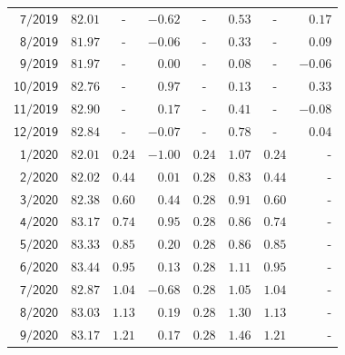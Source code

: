 \documentclass[11pt,a4paper]{article}
\begin{document}
\begin{minipage}[t]{0.54\textwidth}
\begin{tabular}{rccrcrcr}
$\mathsf{7/2019}$ & $\mathsf{82.01}$ & - & $\mathsf{-0.62}$ & - & $\mathsf{0.53}$ & - & $\mathsf{0.17}$ \\
$\mathsf{8/2019}$ & $\mathsf{81.97}$ & - & $\mathsf{-0.06}$ & - & $\mathsf{0.33}$ & - & $\mathsf{0.09}$ \\
$\mathsf{9/2019}$ & $\mathsf{81.97}$ & - & $\mathsf{0.00}$ & - & $\mathsf{0.08}$ & - & $\mathsf{-0.06}$ \\
$\mathsf{10/2019}$ & $\mathsf{82.76}$ & - & $\mathsf{0.97}$ & - & $\mathsf{0.13}$ & - & $\mathsf{0.33}$ \\
$\mathsf{11/2019}$ & $\mathsf{82.90}$ & - & $\mathsf{0.17}$ & - & $\mathsf{0.41}$ & - & $\mathsf{-0.08}$ \\
$\mathsf{12/2019}$ & $\mathsf{82.84}$ & - & $\mathsf{-0.07}$ & - & $\mathsf{0.78}$ & - & $\mathsf{0.04}$ \\
\rowcolor{black!7}$\mathsf{1/2020}$ & $\mathsf{82.01}$ & $\mathsf{0.24}$ & $\mathsf{-1.00}$ & $\mathsf{0.24}$ & $\mathsf{1.07}$ & $\mathsf{0.24}$ & - \\
\rowcolor{black!7}$\mathsf{2/2020}$ & $\mathsf{82.02}$ & $\mathsf{0.44}$ & $\mathsf{0.01}$ & $\mathsf{0.28}$ & $\mathsf{0.83}$ & $\mathsf{0.44}$ & - \\
\rowcolor{black!7}$\mathsf{3/2020}$ & $\mathsf{82.38}$ & $\mathsf{0.60}$ & $\mathsf{0.44}$ & $\mathsf{0.28}$ & $\mathsf{0.91}$ & $\mathsf{0.60}$ & - \\
\rowcolor{black!7}$\mathsf{4/2020}$ & $\mathsf{83.17}$ & $\mathsf{0.74}$ & $\mathsf{0.95}$ & $\mathsf{0.28}$ & $\mathsf{0.86}$ & $\mathsf{0.74}$ & - \\
\rowcolor{black!7}$\mathsf{5/2020}$ & $\mathsf{83.33}$ & $\mathsf{0.85}$ & $\mathsf{0.20}$ & $\mathsf{0.28}$ & $\mathsf{0.86}$ & $\mathsf{0.85}$ & - \\
\rowcolor{black!7}$\mathsf{6/2020}$ & $\mathsf{83.44}$ & $\mathsf{0.95}$ & $\mathsf{0.13}$ & $\mathsf{0.28}$ & $\mathsf{1.11}$ & $\mathsf{0.95}$ & - \\
\rowcolor{black!7}$\mathsf{7/2020}$ & $\mathsf{82.87}$ & $\mathsf{1.04}$ & $\mathsf{-0.68}$ & $\mathsf{0.28}$ & $\mathsf{1.05}$ & $\mathsf{1.04}$ & - \\
\rowcolor{black!7}$\mathsf{8/2020}$ & $\mathsf{83.03}$ & $\mathsf{1.13}$ & $\mathsf{0.19}$ & $\mathsf{0.28}$ & $\mathsf{1.30}$ & $\mathsf{1.13}$ & - \\
\rowcolor{black!7}$\mathsf{9/2020}$ & $\mathsf{83.17}$ & $\mathsf{1.21}$ & $\mathsf{0.17}$ & $\mathsf{0.28}$ & $\mathsf{1.46}$ & $\mathsf{1.21}$ & - \\

\end{tabular}
\end{minipage}
\end{document}
